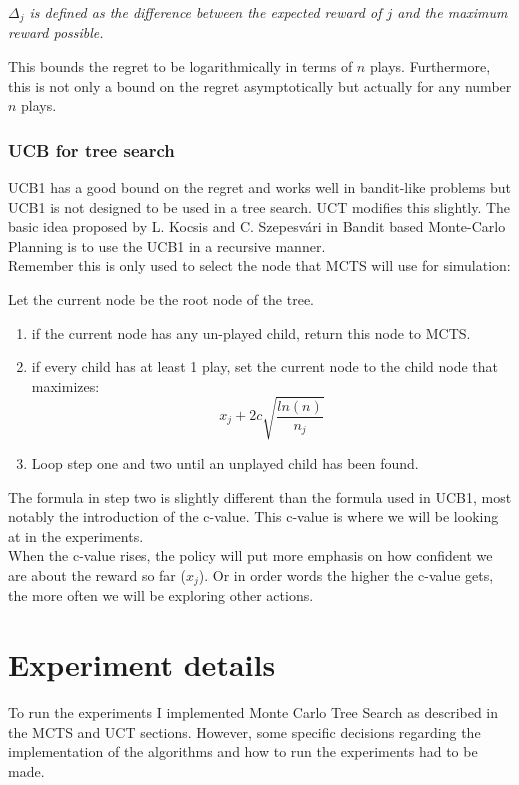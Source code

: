 \documentclass[
11pt, %
english, %
singlespacing, %
headsepline, %
]{MastersDoctoralThesis} %
\begin{document}
\textit{$\Delta_j$ is defined as the difference between the expected reward of $j$ and the maximum reward possible.\\}

This bounds the regret to be logarithmically in terms of $n$ plays. Furthermore, this is not only a bound on the regret asymptotically but actually for any number $n$ plays.

\subsection{UCB for tree search}
UCB1 has a good bound on the regret and works well in bandit-like problems but UCB1 is not designed to be used in a tree search. UCT modifies this slightly. The basic idea proposed by L. Kocsis and C. Szepesv{\'a}ri in Bandit based Monte-Carlo Planning\cite{Kocsis:2006} is to use the UCB1 in a recursive manner.\\

Remember this is only used to select the node that MCTS will use for simulation:

Let the current node be the root node of the tree.
\begin{enumerate}
	\item if the current node has any un-played child, return this node to MCTS.
	\item if every child has at least 1 play, set the current node to the child node that maximizes:
	\[
	x_j + 2c\sqrt{\dfrac{ln(n)}{n_j}}
	\]
	\item Loop step one and two until an unplayed child has been found.
\end{enumerate}


The formula in step two is slightly different than the formula used in UCB1, most notably the introduction of the c-value. This c-value is where we will be looking at in the experiments.\\

When the c-value rises, the policy will put more emphasis on how confident we are about the reward so far ($x_j$). Or in order words the higher the c-value gets, the more often we will be exploring other actions.

\chapter{Experiment details}
To run the experiments I implemented Monte Carlo Tree Search as described in the MCTS and UCT sections. However, some specific decisions regarding the implementation of the algorithms and how to run the experiments had to be made.
\end{document}
